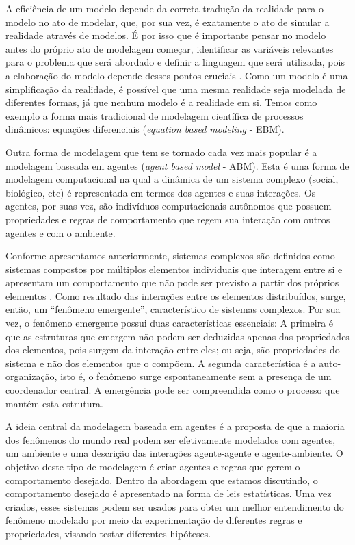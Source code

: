 A eficiência de um modelo depende da correta tradução da realidade para o modelo no ato de modelar, que, por sua vez, é exatamente o ato de simular a realidade através de modelos. É por isso que é importante pensar no modelo antes do próprio ato de modelagem começar, identificar as variáveis relevantes para o problema que será abordado e definir a linguagem que será utilizada, pois a elaboração do modelo depende desses pontos cruciais \cite{phdthesis}.  Como um modelo é uma simplificação da realidade, é possível que uma mesma realidade seja modelada de diferentes formas, já que nenhum modelo é a realidade em si. Temos como exemplo a forma mais tradicional de modelagem científica de processos dinâmicos: equações diferenciais (\textit{equation based modeling} - EBM). 

Outra forma de modelagem que tem se tornado cada vez mais popular é a modelagem baseada em agentes (\textit{agent based model} - ABM). Esta é uma forma de modelagem computacional na qual a dinâmica de um sistema complexo (social, biológico, etc) é representada em termos dos agentes e suas interações. Os agentes, por suas vez, são indivíduos computacionais autônomos que possuem propriedades e regras de comportamento que regem sua interação com outros agentes e com o ambiente.

Conforme apresentamos anteriormente, sistemas complexos são definidos como sistemas compostos por múltiplos elementos individuais que interagem entre si e apresentam um comportamento que não pode ser previsto a partir dos próprios elementos \cite{10.2307/j.ctt17kk851}. Como resultado das interações entre os elementos distribuídos, surge, então, um ``fenômeno emergente'', característico de sistemas complexos. Por sua vez, o fenômeno emergente possui duas características essenciais: A primeira é que as estruturas que emergem não podem ser deduzidas apenas das propriedades dos elementos, pois surgem da interação entre eles; ou seja, são propriedades do sistema e não dos elementos que o compõem. A segunda característica é a auto-organização, isto é,  o fenômeno surge espontaneamente sem a presença de um coordenador central. A emergência pode ser compreendida como o processo que mantém esta estrutura.

A ideia central da modelagem baseada em agentes é a proposta de que a maioria dos fenômenos do mundo real podem ser efetivamente modelados com agentes, um ambiente e uma descrição das interações agente-agente e agente-ambiente. O objetivo deste tipo de modelagem é criar agentes e regras que gerem o comportamento desejado. Dentro da abordagem que estamos discutindo, o comportamento desejado é apresentado na forma de leis estatísticas. Uma vez criados, esses sistemas podem ser usados para obter um melhor entendimento do fenômeno modelado por meio da experimentação de diferentes regras e propriedades, visando testar diferentes hipóteses.

